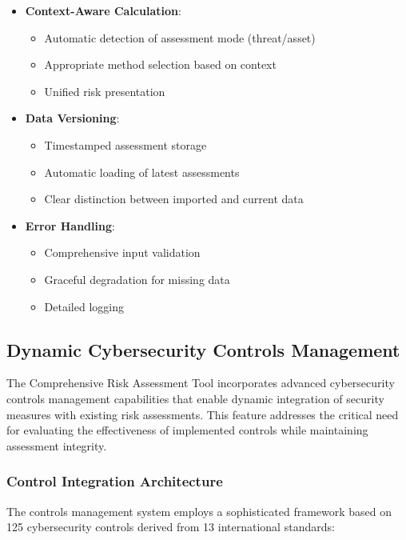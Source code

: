 \documentclass[binding=0.6cm]{sapthesis}
\begin{document}
\begin{itemize}
\item \textbf{Context-Aware Calculation}:
\begin{itemize}
\item Automatic detection of assessment mode (threat/asset)
\item Appropriate method selection based on context
\item Unified risk presentation
\end{itemize}

\item \textbf{Data Versioning}:
\begin{itemize}
    \item Timestamped assessment storage
    \item Automatic loading of latest assessments
    \item Clear distinction between imported and current data
\end{itemize}

\item \textbf{Error Handling}:
\begin{itemize}
    \item Comprehensive input validation
    \item Graceful degradation for missing data
    \item Detailed logging
\end{itemize}
\end{itemize}

\subsection{Dynamic Cybersecurity Controls Management}

The Comprehensive Risk Assessment Tool incorporates advanced cybersecurity controls management capabilities that enable dynamic integration of security measures with existing risk assessments. This feature addresses the critical need for evaluating the effectiveness of implemented controls while maintaining assessment integrity.

\subsubsection{Control Integration Architecture}

The controls management system employs a sophisticated framework based on 125 cybersecurity controls derived from 13 international standards:
\end{document}
